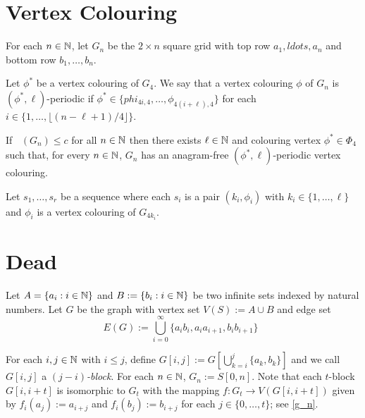 \documentclass{patmorin}
\DeclareMathOperator{\pw}{pw}
\DeclareMathOperator{\afcn}{\dot{\chi}_\pi}
\begin{document}
\section{Vertex Colouring}
\label{vertex_colourings}

For each $n\in\mathbb{N}$, let $G_n$ be the $2\times n$ square grid with top row $a_1,ldots,a_n$ and bottom row $b_1,\ldots,b_n$.


Let $\phi^*$ be a vertex colouring of $G_4$.  We say that a vertex colouring $\phi$ of $G_n$ is $(\phi^*,\ell)$-periodic if $\phi^*\in \{phi_{4i,4},\ldots,\phi_{4(i+\ell),4}\}$ for each $i\in\{1,\ldots,\lfloor(n-\ell+1)/4\rfloor\}$.

\begin{lem}
    If $\afcn(G_n)\le c$ for all $n\in\mathbb{N}$ then there exists $\ell\in\mathbb{N}$ and colouring vertex $\phi^*\in\Phi_4$ such that, for every $n\in\mathbb{N}$, $G_n$ has an anagram-free $(\phi^*,\ell)$-periodic vertex colouring.
\end{lem}


Let $s_1,\ldots,s_r$ be a sequence where each $s_i$ is a pair $(k_i,\phi_i)$ with $k_i\in\{1,\ldots,\ell\}$ and $\phi_i$ is a vertex colouring of $G_{4k_i}$.  









\section{Dead}











Let $A=\{a_i:i\in\mathbb{N}\}$ and $B:=\{b_i:i\in\mathbb{N}\}$ be two infinite sets indexed by natural numbers.  Let $G$ be the graph with vertex set $V(S):=A\cup B$  and edge set
\[
    E(G) := \bigcup_{i=0}^{\infty} \{a_ib_i,a_ia_{i+1},b_ib_{i+1}\} \enspace
\]

For each $i,j\in\mathbb{N}$ with $i\le j$, define $G[i,j]:=G[\bigcup_{k=i}^j\{a_k,b_k\}]$ and we call $G[i,j]$ a \emph{$(j-i)$-block}.  For each $n\in\mathbb{N}$, $G_n:=S[0,n]$.  Note that each $t$-block $G[i,i+t]$ is isomorphic to $G_t$ with the mapping $f:G_t\to V(G[i,i+t])$ given by $f_i(a_{j}):=a_{i+j}$ and $f_i(b_{j}):=b_{i+j}$ for each $j\in\{0,\ldots,t\}$; see \cref{g_n}.
\end{document}
